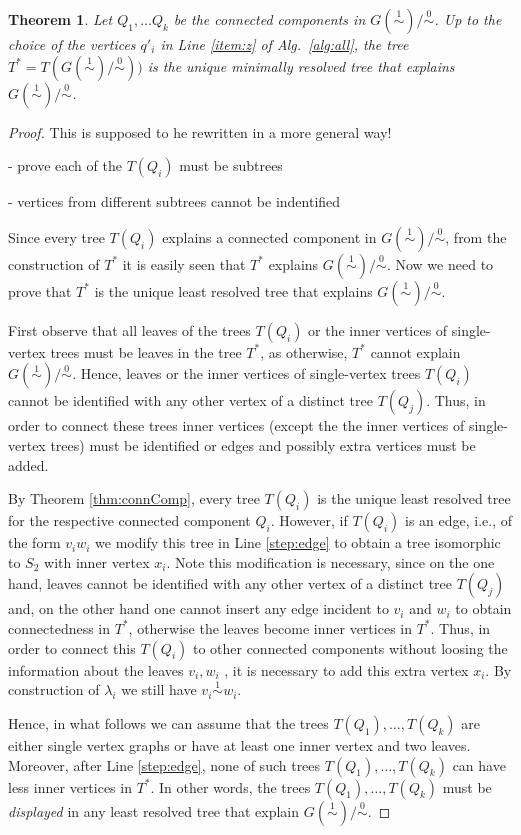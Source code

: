 \documentclass[smallextended]{svjour3}
\newcommand{\rev}[1]{\begingroup\color{blue}#1\endgroup}
\newcommand{\TODO}[1]{\begingroup\color{red}#1\endgroup}
\newcommand{\remove}[1]{\begingroup\tiny\color{magenta}#1\endgroup}
\newcommand{\Ro}{\mathrel{\overset{0}{\sim}}}
\newcommand{\Rl}{\mathrel{\overset{1}{\sim}}}
\newtheorem{thm}{Theorem}
\begin{document}
\begin{thm}
  Let $Q_1,\dots Q_k$ be the connected components in $G(\Rl)/\Ro$.  Up to
  the choice of the vertices $q'_i$ in Line \ref{item:z} of Alg.\
  \ref{alg:all}, the tree $T^* = T(G(\Rl)/\Ro))$ is the \rev{unique
    minimally} resolved tree that explains $G(\Rl)/\Ro$.
  \label{thm:star-tree}
\end{thm}
\begin{proof}

  \TODO{This is supposed to he rewritten in a more general way!}

  \TODO{- prove each of the $T(Q_i)$ must be subtrees}

  \TODO{- vertices from different subtrees cannot be indentified}

\remove{
  Since every tree $T(Q_i)$ explains a connected component in $G(\Rl)/\Ro$,
  from the construction of $T^*$ it is easily seen that $T^*$ explains
  $G(\Rl)/\Ro$.  Now we need to prove that $T^*$ is the unique least resolved
  tree that explains $G(\Rl)/\Ro$.
        
  First observe that all leaves of the trees $T(Q_i)$ or the inner vertices
  of single-vertex trees must be leaves in the tree $T^*$, as otherwise,
  $T^*$ cannot explain $G(\Rl)/\Ro$.  Hence, leaves or the inner vertices
  of single-vertex trees $T(Q_i)$ cannot be identified with any other
  vertex of a distinct tree $T(Q_j)$.  Thus, in order to connect these
  trees inner vertices (except the the inner vertices of single-vertex
  trees) must be identified or edges and possibly extra vertices must be
  added.

  By Theorem \ref{thm:connComp}, every tree $T(Q_i)$ is the unique least
  resolved tree for the respective connected component $Q_i$.  However, if
  $T(Q_i)$ is an edge, i.e., of the form $v_iw_i$ we modify this tree in
  Line \ref{step:edge} to obtain a tree isomorphic to $S_2$ with inner
  vertex $x_i$.  Note this modification is necessary, since on the one
  hand, leaves cannot be identified with any other vertex of a distinct
  tree $T(Q_j)$ and, on the other hand one cannot insert any edge incident
  to $v_i$ and $w_i$ to obtain connectedness in $T^*$, otherwise the leaves
  become inner vertices in $T^*$. Thus, in order to connect this $T(Q_i)$
  to other connected components without loosing the information about the
  leaves $v_i,w_i$ , it is necessary to add this extra vertex $x_i$.  By
  construction of $\lambda_i$ we still have $v_i\Rl w_i$.

  Hence, in what follows we can assume that the trees $T(Q_1),\dots,T(Q_k)$
  are either single vertex graphs or have at least one inner vertex and two
  leaves.  Moreover, after Line \ref{step:edge}, none of such trees
  $T(Q_1),\dots,T(Q_k)$ can have less inner vertices in $T^*$. In other
  words, the trees $T(Q_1),\dots,T(Q_k)$ must be \emph{displayed} in any
  least resolved tree that explain $G(\Rl)/\Ro$.
        
}
\end{proof}
\end{document}
